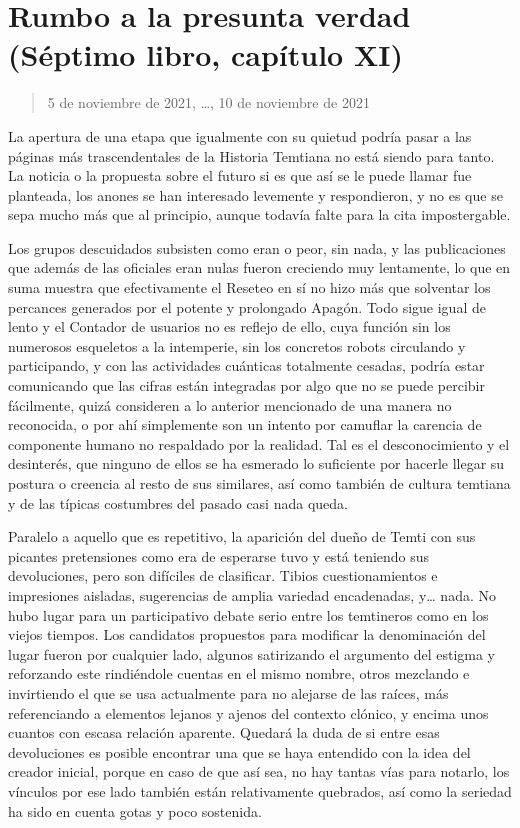 \documentclass[
]{book}
\begin{document}
\hypertarget{rumbo-a-la-presunta-verdad-suxe9ptimo-libro-capuxedtulo-xi}{%
\section{Rumbo a la presunta verdad (Séptimo libro, capítulo XI)}\label{rumbo-a-la-presunta-verdad-suxe9ptimo-libro-capuxedtulo-xi}}

\begin{quote}
5 de noviembre de 2021, \ldots, 10 de noviembre de 2021
\end{quote}

La apertura de una etapa que igualmente con su quietud podría pasar a las páginas más trascendentales de la Historia Temtiana no está siendo para tanto. La noticia o la propuesta sobre el futuro si es que así se le puede llamar fue planteada, los anones se han interesado levemente y respondieron, y no es que se sepa mucho más que al principio, aunque todavía falte para la cita impostergable.

Los grupos descuidados subsisten como eran o peor, sin nada, y las publicaciones que además de las oficiales eran nulas fueron creciendo muy lentamente, lo que en suma muestra que efectivamente el Reseteo en sí no hizo más que solventar los percances generados por el potente y prolongado Apagón. Todo sigue igual de lento y el Contador de usuarios no es reflejo de ello, cuya función sin los numerosos esqueletos a la intemperie, sin los concretos robots circulando y participando, y con las actividades cuánticas totalmente cesadas, podría estar comunicando que las cifras están integradas por algo que no se puede percibir fácilmente, quizá consideren a lo anterior mencionado de una manera no reconocida, o por ahí simplemente son un intento por camuflar la carencia de componente humano no respaldado por la realidad. Tal es el desconocimiento y el desinterés, que ninguno de ellos se ha esmerado lo suficiente por hacerle llegar su postura o creencia al resto de sus similares, así como también de cultura temtiana y de las típicas costumbres del pasado casi nada queda.

Paralelo a aquello que es repetitivo, la aparición del dueño de Temti con sus picantes pretensiones como era de esperarse tuvo y está teniendo sus devoluciones, pero son difíciles de clasificar. Tibios cuestionamientos e impresiones aisladas, sugerencias de amplia variedad encadenadas, y\ldots{} nada. No hubo lugar para un participativo debate serio entre los temtineros como en los viejos tiempos. Los candidatos propuestos para modificar la denominación del lugar fueron por cualquier lado, algunos satirizando el argumento del estigma y reforzando este rindiéndole cuentas en el mismo nombre, otros mezclando e invirtiendo el que se usa actualmente para no alejarse de las raíces, más referenciando a elementos lejanos y ajenos del contexto clónico, y encima unos cuantos con escasa relación aparente. Quedará la duda de si entre esas devoluciones es posible encontrar una que se haya entendido con la idea del creador inicial, porque en caso de que así sea, no hay tantas vías para notarlo, los vínculos por ese lado también están relativamente quebrados, así como la seriedad ha sido en cuenta gotas y poco sostenida.
\end{document}
